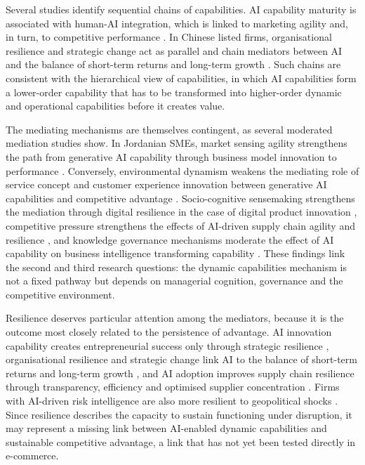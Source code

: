 Several studies identify sequential chains of capabilities. AI capability maturity is associated with human-AI integration, which is linked to marketing agility and, in turn, to competitive performance . In Chinese listed firms, organisational resilience and strategic change act as parallel and chain mediators between AI and the balance of short-term returns and long-term growth . Such chains are consistent with the hierarchical view of capabilities, in which AI capabilities form a lower-order capability that has to be transformed into higher-order dynamic and operational capabilities before it creates value.

The mediating mechanisms are themselves contingent, as several moderated mediation studies show. In Jordanian SMEs, market sensing agility strengthens the path from generative AI capability through business model innovation to performance . Conversely, environmental dynamism weakens the mediating role of service concept and customer experience innovation between generative AI capabilities and competitive advantage . Socio-cognitive sensemaking strengthens the mediation through digital resilience in the case of digital product innovation , competitive pressure strengthens the effects of AI-driven supply chain agility and resilience , and knowledge governance mechanisms moderate the effect of AI capability on business intelligence transforming capability . These findings link the second and third research questions: the dynamic capabilities mechanism is not a fixed pathway but depends on managerial cognition, governance and the competitive environment.

Resilience deserves particular attention among the mediators, because it is the outcome most closely related to the persistence of advantage. AI innovation capability creates entrepreneurial success only through strategic resilience , organisational resilience and strategic change link AI to the balance of short-term returns and long-term growth , and AI adoption improves supply chain resilience through transparency, efficiency and optimised supplier concentration . Firms with AI-driven risk intelligence are also more resilient to geopolitical shocks . Since resilience describes the capacity to sustain functioning under disruption, it may represent a missing link between AI-enabled dynamic capabilities and sustainable competitive advantage, a link that has not yet been tested directly in e-commerce.

